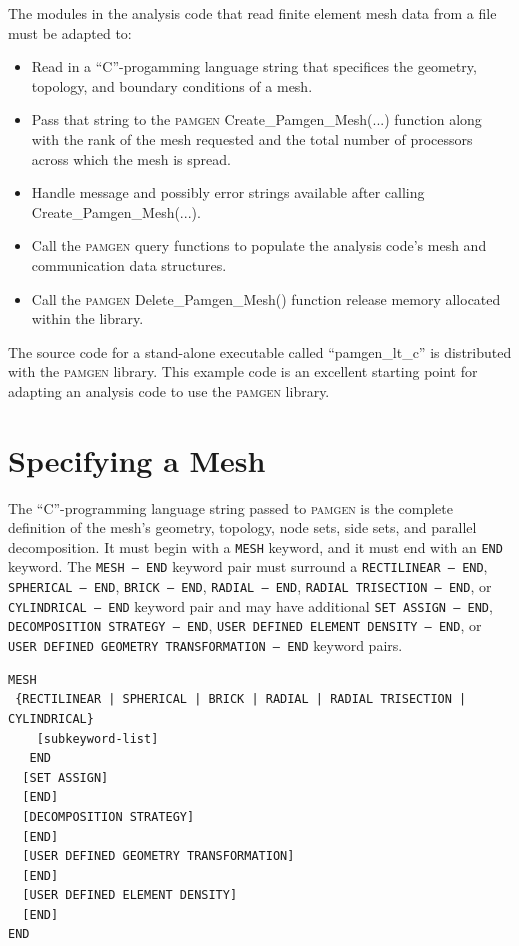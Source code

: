 The modules in the analysis code that read finite element mesh data from a file must be adapted to:
\begin{itemize}\addtolength{\itemsep}{-0.5\baselineskip}
\item Read in a ``C''-progamming language string that specifices the geometry, topology, and boundary conditions of a mesh.
\item Pass that string to the \textsc{pamgen} Create\_Pamgen\_Mesh(...) function along with the rank of the mesh requested and the total number of processors across which the mesh is spread.
\item Handle message and possibly error strings available after calling Create\_Pamgen\_Mesh(...).
\item Call the \textsc{pamgen} query functions to populate the analysis code's mesh and communication data structures.
\item Call the \textsc{pamgen} Delete\_Pamgen\_Mesh() function release memory allocated within the library.
\end{itemize}

The source code for a stand-alone executable called ``pamgen\_lt\_c'' is distributed with the \textsc{pamgen} library. This example code is an excellent starting point for adapting an analysis code to use the \textsc{pamgen} library.


\clearpage
\section{Specifying a Mesh}\label{sec:specifying_a_mesh}

The ``C''-programming language string passed to \textsc{pamgen} is the complete definition of the mesh's geometry, topology, node sets, side sets, and parallel decomposition. It must begin with a \texttt{MESH} keyword, and it must end with an \texttt{END} keyword. The \texttt{MESH -- END} keyword pair must surround a \texttt{RECTILINEAR --
END}, \texttt{SPHERICAL -- END}, \texttt{BRICK -- END}, \texttt{RADIAL -- END}, \texttt{RADIAL TRISECTION -- END}, or \texttt{CYLINDRICAL -- END}
keyword pair and may have additional \texttt{SET ASSIGN -- END}, \texttt{DECOMPOSITION STRATEGY -- END},
\texttt{USER DEFINED ELEMENT DENSITY -- END}, or \texttt{USER DEFINED GEOMETRY TRANSFORMATION -- END} keyword pairs.

{\ttfamily \begin{verbatim}
MESH
 {RECTILINEAR | SPHERICAL | BRICK | RADIAL | RADIAL TRISECTION | CYLINDRICAL}
    [subkeyword-list]
   END
  [SET ASSIGN]
  [END]
  [DECOMPOSITION STRATEGY]
  [END]
  [USER DEFINED GEOMETRY TRANSFORMATION]
  [END]
  [USER DEFINED ELEMENT DENSITY]
  [END]
END
\end{verbatim}
}

